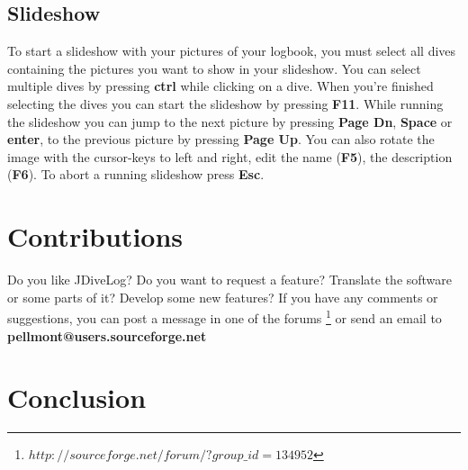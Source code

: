 \documentclass[10pt,a4paper,titlepage]{report}
\begin{document}
\section{Slideshow}
To start a slideshow with your pictures of your logbook, you must select all dives containing the pictures you want to show
in your slideshow. You can select multiple dives by pressing \textbf{ctrl} while clicking on a dive. When you're finished selecting the
dives you can start the slideshow by pressing \textbf{F11}. While running the slideshow you can jump to the next picture by pressing \textbf{Page Dn}, \textbf{Space} or \textbf{enter}, to the previous picture by pressing \textbf{Page Up}. You can also rotate the image with the cursor-keys to left and right, edit the name (\textbf{F5}), the description (\textbf{F6}). To abort a running slideshow press \textbf{Esc}.
\chapter{Contributions}
Do you like JDiveLog? Do you want to request a feature? Translate the software or some parts of it? Develop some new features?
If you have any comments or suggestions, you can post a message in one of the forums \footnote{$http://sourceforge.net/forum/?group\_id=134952$}  or send an email to \textbf{pellmont@users.sourceforge.net}
\chapter{Conclusion}
\end{document}
